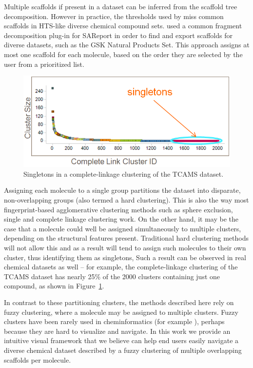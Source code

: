 \documentclass[journal=jacsat,manuscript=article]{achemso}
\newcommand*\fref[1]{Figure~\ref{fig:#1}}
\begin{document}
Multiple scaffolds if present in a dataset can be inferred from the
scaffold tree decomposition\cite{ClarkLabute2008SAReport}. However in
practice, the thresholds used by \citeauthor{ClarkLabute2008SAReport}
miss common scaffolds in HTS-like diverse chemical compound
sets. \citeauthor{Bandyopadhyay2012ACS} used a common fragment
decomposition plug-in for SAReport in order to find and export
scaffolds for diverse datasets, such as the GSK Natural Products
Set\cite{Coma2014}.  This approach assigns at most one scaffold for
each molecule, based on the order they are selected by the user from a
prioritized list.

\begin{figure}
\includegraphics[width=5.5in]{fig/singletons.png}
\caption{Singletons in a complete-linkage clustering of the TCAMS dataset.}
\label{fig:platypus}
\end{figure}

Assigning each molecule to a single group partitions the dataset into
disparate, non-overlapping groups (also termed a hard clustering).
This is also the way most fingerprint-based agglomerative clustering
methods such as sphere exclusion, single and complete linkage
clustering work\cite{Downs2003}. On the other hand, it may be the case
that a molecule could well be assigned simultaneously to multiple
clusters, depending on the structural features present. Traditional
hard clustering methods will not allow this and as a result will tend
to assign such molecules to their own cluster, thus identifying them
as singletons, Such a result can be observed in real chemical datasets
as well -- for example, the complete-linkage clustering of the TCAMS
dataset\cite{Gamo2010,Calderon2011} has nearly 25\% of the 2000
clusters containing just one compound, as shown in \fref{platypus}.

In contrast to these partitioning clusters, the methods described
here rely on fuzzy clustering, where a molecule may be assigned to
multiple clusters. Fuzzy clusters have been rarely used in
cheminformatics (for example \cite{Holliday2004,Richmond2013Galois}),
perhaps because they are hard to visualize and navigate.  In this work
we provide an intuitive visual framework that we believe can help end
users easily navigate a diverse chemical dataset described by a fuzzy
clustering of multiple overlapping scaffolds per molecule.
\end{document}
